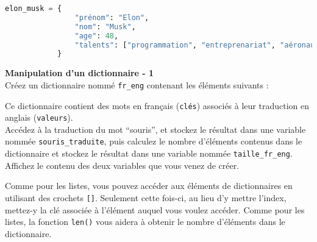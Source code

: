 	 \begin{lstlisting}[language=Python]
          elon_musk = {
                "prénom": "Elon",
                "nom": "Musk",
                "age": 48,
                "talents": ["programmation", "entreprenariat", "aéronautique"]
            }   \end{lstlisting}
				
	\begin{Exercice}[5 minutes] \textbf{Manipulation d'un dictionnaire - 1}\\
       Créez un dictionnaire nommé \lstinline{fr_eng} contenant les éléments suivants :
       
       
       
       Ce dictionnaire contient des mots en français (\lstinline{clés}) associés à leur traduction en anglais (\lstinline{valeurs}). \\
       
       Accédez à la traduction du mot ``souris'', et stockez le résultat dans une variable nommée \lstinline{souris_traduite}, puis calculez le nombre d'éléments contenus dans le dictionnaire et stockez le résultat dans une variable nommée \lstinline{taille_fr_eng}. Affichez le contenu des deux variables que vous venez de créer.
    
        \begin{conseil}
            Comme pour les listes, vous pouvez accéder aux éléments de dictionnaires en utilisant des crochets \lstinline{[]}. Seulement cette fois-ci, au lieu d'y mettre l'index, mettez-y la clé associée à l'élément auquel vous voulez accéder. Comme pour les listes, la fonction \lstinline{len()} vous aidera à obtenir le nombre d'éléments dans le dictionnaire.
        \end{conseil}
        
        \begin{solution}
             
        \end{solution}
    \end{Exercice}
    
